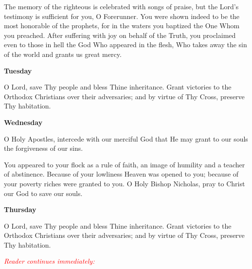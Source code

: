 \documentclass[paper=a6,fontsize=2.3mm]{scrartcl}
\begin{document}
\hangindent=10mm
\noindent{}The memory of the righteous is celebrated 
with songs of praise, but the Lord's testimony is sufficient for you, O 
Forerunner.  You were shown indeed to be the most honorable of the prophets, 
for in the waters you baptized the One Whom you preached.  After suffering with 
joy on behalf of the Truth, you proclaimed even to those in hell the God Who 
appeared in the flesh, Who takes away the sin of the world and grants us great 
mercy.

\begin{center}
\textbf{Tuesday}
\end{center}

\hangindent=10mm
\noindent\makebox[10mm][l]{}O Lord, save Thy people and bless Thine 
inheritance.  Grant victories to the Orthodox Christians over their 
adversaries; and by virtue of Thy Cross, preserve Thy habitation.


\begin{center}
\textbf{Wednesday}
\end{center}

\noindent\makebox[10mm][l]{}
\begin{minipage}[t]{\dimexpr \textwidth-10mm}
O Holy Apostles, intercede with our merciful God that He may grant to our souls the forgiveness of our sins.

You appeared to your flock as a rule of faith, an image of humility and a teacher of abstinence.  Because of your lowliness Heaven was opened to you; because of your poverty riches were granted to you.  O Holy Bishop Nicholas, pray to Christ our God to save our souls.
\end{minipage}

\begin{center}
\textbf{Thursday}
\end{center}

\hangindent=10mm
\noindent\makebox[10mm][l]{}O Lord, save Thy people and bless Thine 
inheritance.  Grant victories to the Orthodox Christians over their 
adversaries; and by virtue of Thy Cross, preserve Thy habitation.

\noindent
\textcolor{red}{\textit{Reader continues immediately:}}
\end{document}
